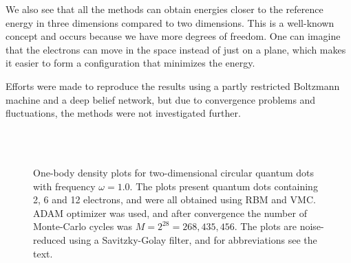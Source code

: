 We also see that all the methods can obtain energies closer to the reference energy in three dimensions compared to two dimensions. This is a well-known concept and occurs because we have more degrees of freedom. One can imagine that the electrons can move in the space instead of just on a plane, which makes it easier to form a configuration that minimizes the energy. 

Efforts were made to reproduce the results using a partly restricted Boltzmann machine and a deep belief network, but due to convergence problems and fluctuations, the methods were not investigated further. 

\begin{figure}
	\centering
	\captionsetup[subfigure]{labelformat=empty}
	\hspace{0.1cm}
	\hspace{-0.0cm}
	\\
	
	\hspace{0.05cm}
	\hspace{-0.0cm}
	\\
	
	\hspace{0.1cm}
	\hspace{-0.0cm}
	
	\caption{One-body density plots for two-dimensional circular quantum dots with frequency $\omega=1.0$. The plots present quantum dots containing 2, 6 and 12 electrons, and were all obtained using RBM and VMC. ADAM optimizer was used, and after convergence the number of Monte-Carlo cycles was $M=2^{28}=268,435,456$. The plots are noise-reduced using a Savitzky-Golay filter, and for abbreviations see the text.}
	\label{fig:OB_interaction_1p0w1}
\end{figure}
